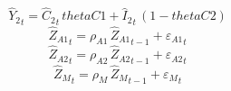 \begin{dmath}
{{\hat{Y}_{2}}}_{t}={{\hat{C}_{2}}}_{t}\, {thetaC1}+{{\hat{I}_{2}}}_{t}\, \left(1-{thetaC2}\right)
\end{dmath}
\begin{dmath}
{{\hat{Z}_{A1}}}_{t}={{\rho_{A1}}}\, {{\hat{Z}_{A1}}}_{t-1}+{{\varepsilon_{A1}}}_{t}
\end{dmath}
\begin{dmath}
{{\hat{Z}_{A2}}}_{t}={{\rho_{A2}}}\, {{\hat{Z}_{A2}}}_{t-1}+{{\varepsilon_{A2}}}_{t}
\end{dmath}
\begin{dmath}
{{\hat{Z}_M}}_{t}={{\rho_{M}}}\, {{\hat{Z}_M}}_{t-1}+{{\varepsilon_{M}}}_{t}
\end{dmath}
